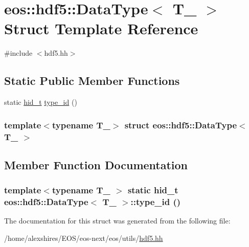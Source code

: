 \hypertarget{structeos_1_1hdf5_1_1DataType}{
\section{eos::hdf5::DataType$<$ T\_\- $>$ Struct Template Reference}
\label{structeos_1_1hdf5_1_1DataType}
}


{\ttfamily \#include $<$hdf5.hh$>$}\subsection*{Static Public Member Functions}
\begin{DoxyCompactItemize}
\item 
static \hyperlink{namespaceeos_1_1hdf5_a5bd5e209f1bf36cdc5551465dacf2e74}{hid\_\-t} \hyperlink{structeos_1_1hdf5_1_1DataType_a96dea8ef1e40e5af0c68658d9155bd44}{type\_\-id} ()
\end{DoxyCompactItemize}
\subsubsection*{template$<$typename T\_\-$>$ struct eos::hdf5::DataType$<$ T\_\- $>$}



\subsection{Member Function Documentation}
\hypertarget{structeos_1_1hdf5_1_1DataType_a96dea8ef1e40e5af0c68658d9155bd44}{
\subsubsection[{type\_\-id}]{\setlength{\rightskip}{0pt plus 5cm}template$<$typename T\_\- $>$ static {\bf hid\_\-t} {\bf eos::hdf5::DataType}$<$ T\_\- $>$::type\_\-id ()}}
\label{structeos_1_1hdf5_1_1DataType_a96dea8ef1e40e5af0c68658d9155bd44}


The documentation for this struct was generated from the following file:\begin{DoxyCompactItemize}
\item 
/home/alexshires/EOS/eos-\/next/eos/utils/\hyperlink{hdf5_8hh}{hdf5.hh}\end{DoxyCompactItemize}
